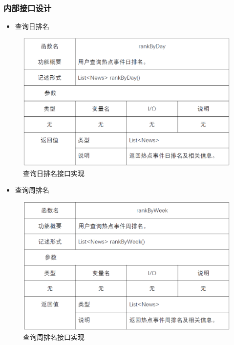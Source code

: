 \subsubsection{内部接口设计}
\begin{itemize}
	\item 查询日排名
\end{itemize}
\begin{figure}[!htbp]
	\centering
	\includegraphics[scale=0.7]{image/b18.png} %
	\caption{查询日排名接口实现} %
\end{figure}
\begin{itemize}
	\item 查询周排名
\end{itemize}
\begin{figure}[!htbp]
	\centering
	\includegraphics[scale=0.7]{image/b19.png} %
	\caption{查询周排名接口实现} %
\end{figure}
